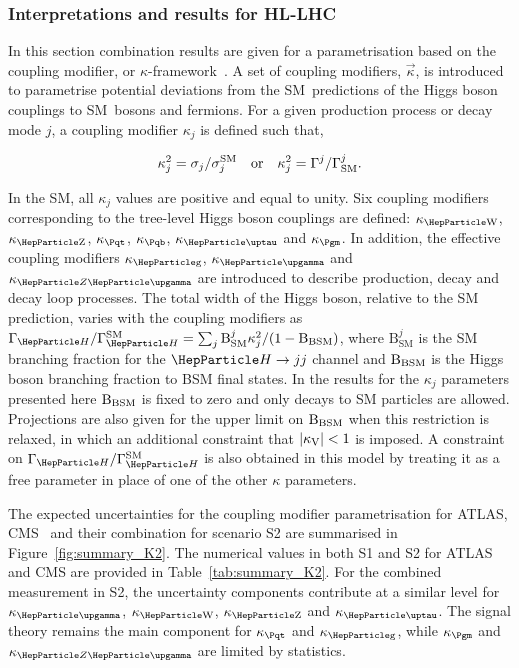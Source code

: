 
\subsubsection{Interpretations and results for HL-LHC}

In this section combination results are given for a parametrisation based on the coupling modifier, or $\kappa$-framework~\cite{Heinemeyer:2013tqa}. A set of coupling modifiers, $\vec\kappa$, is introduced to parametrise potential deviations from the SM~predictions of the Higgs boson couplings to SM~bosons and fermions. For a given production process or decay mode $j$, a coupling modifier $\kappa_j$ is defined such that,

\begin{equation}
\label{eq:kappa}
  \kappa_j^2=\sigma_j/\sigma_j^\SM\ \ \ {\rm or}\ \ \  \kappa_j^2=\Gamma^j/\Gamma^j_\SM.
\end{equation}

In the SM, all $\kappa_j$ values are positive and equal to unity. Six coupling modifiers corresponding to the tree-level Higgs boson couplings are defined: $\kW$, $\kZ$, $\ktop$, $\kb$, $\ktau$ and $\kmu$. In addition, the effective coupling modifiers $\kglu$, $\kgam$ and $\kzgam$ are introduced to describe \ggh production, \hgg decay and \hzg decay loop processes. 
The total width of the Higgs boson, relative to the SM prediction, varies with the coupling modifiers as $\GammaSM = \sum_{j}\mathrm{B}^{j}_{\text{SM}}\kappa_{j}^{2} / (1 - \Bbsm)$, where $\mathrm{B}^{j}_{\text{SM}}$ is the SM branching fraction for the $\PH\rightarrow jj$ channel and $\mathrm{B_{BSM}}$ is the Higgs boson branching fraction to BSM final states. In the results for the $\kappa_j$ parameters presented here $\mathrm{B_{BSM}}$ is fixed to zero and only decays to SM particles are allowed. Projections are also given for the upper limit on $\mathrm{B_{BSM}}$ when this restriction is relaxed, in which an additional constraint that $|\kappa_{\mathrm{V}}| < 1$ is imposed. A constraint on $\GammaSM$ is also obtained in this model by treating it as a free parameter in place of one of the other $\kappa$ parameters.

The expected uncertainties for the coupling modifier parametrisation for ATLAS, CMS~\cite{ATL-PHYS-PUB-2018-054,CMS-PAS-FTR-18-011} and their combination for scenario S2 are summarised in Figure~\ref{fig:summary_K2}. The numerical values in both S1 and S2 for ATLAS and CMS are provided in Table~\ref{tab:summary_K2}.
For the combined measurement in S2, the uncertainty components  contribute at a similar level for $\kgam$, $\kW$, $\kZ$ and $\ktau$. The signal theory remains the main component for $\ktop$ and $\kglu$, while $\kmu$ and $\kzgam$ are limited by statistics.

